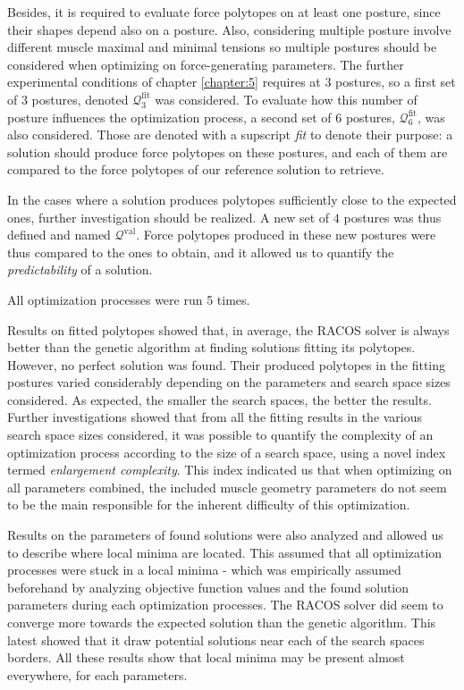 Besides, it is required to evaluate force polytopes on at least one posture, since their shapes depend also on a posture. Also, considering multiple posture involve different muscle maximal and minimal tensions so multiple postures should be considered when optimizing on force-generating parameters. The further experimental conditions of chapter \ref{chapter:5} requires at $3$ postures, so a first set of 3 postures, denoted $\mathcal{Q}_3^{\text{fit}}$ was considered. To evaluate how this number of posture influences the optimization process, a second set of $6$ postures, $\mathcal{Q}_6^{\text{fit}}$, was also considered. Those are denoted with a supscript \emph{fit} to denote their purpose: a solution should produce force polytopes on these postures, and each of them are compared to the force polytopes of our reference solution to retrieve. 

In the cases where a solution produces polytopes sufficiently close to the expected ones, further investigation should be realized. A new set of $4$ postures was thus defined and named $\mathcal{Q}^{\text{val}}$. Force polytopes produced in these new postures were thus compared to the ones to obtain, and it allowed us to quantify the \emph{predictability} of a solution. 

All optimization processes were run 5 times.

Results on fitted polytopes showed that, in average, the RACOS solver is always better than the genetic algorithm at finding solutions fitting its polytopes. However, no perfect solution was found. Their produced polytopes in the fitting postures varied considerably depending on the parameters  and search space sizes considered. As expected, the smaller the search spaces, the better the results. Further investigations showed that from all the fitting results in the various search space sizes considered, it was possible to quantify the complexity of an optimization process according to the size of a search space, using a novel index termed \emph{enlargement complexity}. This index indicated us that when optimizing on all parameters combined, the included muscle geometry parameters do not seem to be the main responsible for the inherent difficulty of this optimization. 

Results on the parameters of found solutions were also analyzed and allowed us to describe where local minima are located. This assumed that all optimization processes were stuck in a local minima - which was empirically assumed beforehand by analyzing objective function values and the found solution parameters during each optimization processes. The RACOS solver did seem to converge more towards the expected solution than the genetic algorithm. This latest showed that it draw potential solutions near each of the search spaces borders. All these results show that local minima may be present almost everywhere, for each parameters.

